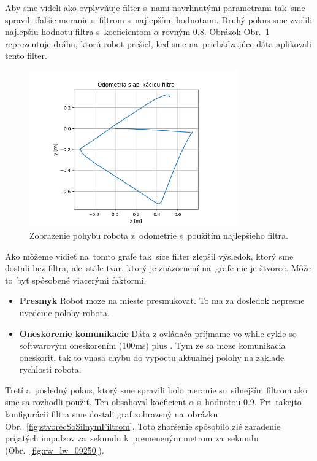 Aby sme videli ako ovplyvňuje filter s~nami navrhnutými parametrami tak~sme spravili ďalšie meranie s~filtrom
s~najlepšími hodnotami. Druhý pokus sme zvolili najlepšiu hodnotu filtra s~koeficientom $\alpha$ rovným 0.8.
Obrázok Obr.~\ref{fig:stvorecSFiltrom} reprezentuje dráhu, ktorú robot prešiel, keď sme na~prichádzajúce dáta
aplikovali tento filter.

\begin{figure}[!htbp]
	\begin{center}
		\includegraphics[width=0.8\textwidth]{img/stvorec_s_filtrom_3.png}
	\end{center}
	\caption{Zobrazenie pohybu robota z~odometrie s~použitím najlepšieho filtra.}
	\label{fig:stvorecSFiltrom}
\end{figure}

Ako môžeme vidieť na~tomto grafe tak~síce filter zlepšil výsledok, ktorý sme dostali bez filtra, ale~stále tvar, ktorý
je znázornení na~grafe nie je štvorec. Môže to~byť spôsobené viacerými faktormi.

\begin{itemize}
	\item \textbf{Presmyk} Robot moze na mieste presmukovat. To ma za dosledok nepresne uvedenie polohy robota.
	\item \textbf{Oneskorenie komunikacie} Dáta z ovládača príjmame vo while cykle so softwarovým oneskorením (100ms)
		plus \cite{timovyProjekt}. Tym ze sa moze komunikacia oneskorit, tak to vnasa chybu do vypoctu aktualnej polohy
		na zaklade rychlosti robota.
\end{itemize}

\clearpage

Tretí a~posledný pokus, ktorý sme spravili bolo meranie so~silnejším filtrom ako sme sa rozhodli použiť. Ten
obsahoval koeficient $\alpha$ s~hodnotou 0.9. Pri~takejto konfigurácii filtra sme dostali graf zobrazený
na~obrázku Obr.~\ref{fig:stvorecSoSilnymFiltrom}. Toto zhoršenie spôsobilo zlé zaradenie prijatých impulzov za~sekundu
k~premeneným metrom za~sekundu (Obr.~\ref{fig:rw_lw_09250}).

